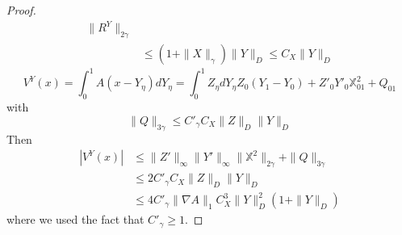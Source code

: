\documentclass[a4paper,12pt,reqno]{amsart}
\newcommand{\norm}[1]{\|#1\|}
\begin{document}
\begin{proof}
\begin{equation}
\begin{split}
  \norm{R^Y}_{2\gamma}
\\ & \le   (1+\norm{X}_\gamma) \norm{Y}_D \le C_X \norm{Y}_D
  \end{split}
\end{equation}
\begin{equation*}
V^Y(x) = \int_0^1 A(x-Y_\eta) dY_\eta = \int_0^1 Z_\eta dY_\eta
 Z_0 (Y_1-Y_0) + Z'_0 Y'_0 \mathbb{X}^2_{01} + Q_{01}
\end{equation*}
with
$$
\norm{Q}_{3\gamma} \le C'_\gamma C_X \norm{Z}_{D} \norm{Y}_D
$$
Then
\begin{equation*}
  \begin{split}
  |V^Y(x)| & \le  \norm{Z'}_\infty \norm{Y'}_\infty
   \norm{\mathbb{X}^2}_{2\gamma} + \norm{Q}_{3\gamma}
\\ & \le 2 C'_\gamma C_X \norm{Z}_D \norm{Y}_D
\\ & \le 4 C'_\gamma
\norm{\nabla A}_1 C_X^3 \norm{Y}_D^2 (1+\norm{Y}_D)
  \end{split}
\end{equation*}
where we used the fact that $C'_\gamma \ge 1$.


\end{proof}
\end{document}
